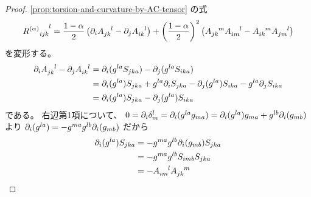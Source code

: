 \documentclass[report]{jlreq}
\begin{document}
\begin{proof}
    \cref{prop:torsion-and-curvature-by-AC-tensor}
    の式
    \begin{equation}
        {R^{(\alpha)}}_{ijk}^{\hphantom{ijk}l}
            = \frac{1 - \alpha}{2} \left({
                \partial_i A_{jk}^{\hphantom{jk}l}
                -
                \partial_j A_{ik}^{\hphantom{ik}l}
            }\right)
            + \left({\frac{1 - \alpha}{2}}\right)^2
            \left({
                A_{jk}^{\hphantom{jk}m} A_{im}^{\hphantom{im}l}
                -
                A_{ik}^{\hphantom{ik}m} A_{jm}^{\hphantom{jm}l}
            }\right)
    \end{equation}
    を変形する。
    \begin{alignat}{1}
        \partial_i A_{jk}^{\hphantom{jk}l}
        -
        \partial_j A_{ik}^{\hphantom{ik}l}
            &=
                \partial_i (
                    g^{la} S_{jka}
                )
                -
                \partial_j (
                    g^{la} S_{ika}
                )
                \\
            &=
                \partial_i (g^{la})
                S_{jka}
                +
                g^{la}
                \partial_i S_{jka}
                -
                \partial_j (g^{la})
                S_{ika}
                -
                g^{la}
                \partial_j S_{ika}
                \\
            &=
                \partial_i (g^{la})
                S_{jka}
                -
                \partial_j (g^{la})
                S_{ika}
    \end{alignat}
    である。
    右辺第1項について、
    $0
        =
            \partial_i \delta_m^l
        =
            \partial_i (g^{la} g_{ma})
        =
            \partial_i (g^{la}) g_{ma}
            +
            g^{lb} \partial_i (g_{mb})$
    より
    $\partial_i (g^{la})
        =
            - g^{ma} g^{lb} \partial_i (g_{mb})$
    だから
    \begin{alignat}{1}
        \partial_i (g^{la})
            S_{jka}
            &=
                -
                g^{ma}
                g^{lb}
                \partial_i (g_{mb})
                S_{jka}
                \\
            &=
                -
                g^{ma}
                g^{lb}
                S_{imb}
                S_{jka}
                \\
            &=
                -
                A_{im}^{\hphantom{im}l}
                A_{jk}^{\hphantom{jk}m}
    \end{alignat}

\end{proof}
\end{document}
